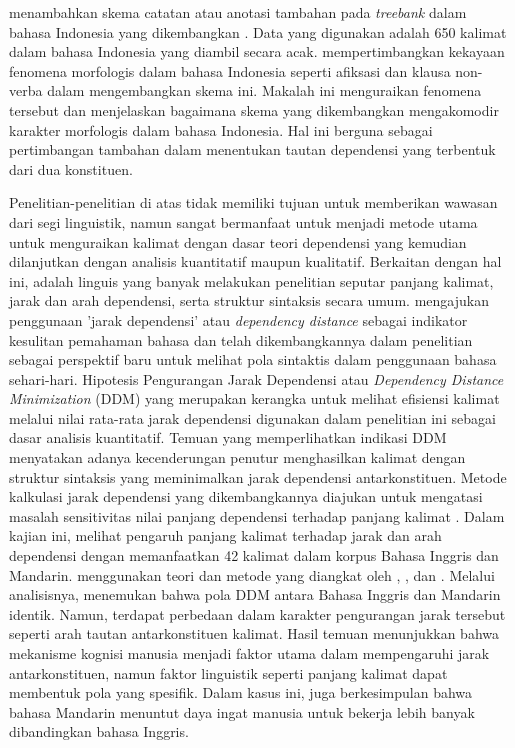 \cite{irmawati2015dependency} menambahkan skema catatan atau anotasi tambahan pada \textit{treebank} dalam bahasa Indonesia yang dikembangkan \cite{green2012indonesian}. Data yang digunakan adalah 650 kalimat dalam bahasa Indonesia yang diambil secara acak. \cite{irmawati2015dependency} mempertimbangkan kekayaan fenomena morfologis dalam bahasa Indonesia seperti afiksasi dan klausa non-verba dalam mengembangkan skema ini. Makalah ini menguraikan fenomena tersebut dan menjelaskan bagaimana skema yang dikembangkan mengakomodir karakter morfologis dalam bahasa Indonesia. Hal ini berguna sebagai pertimbangan tambahan dalam menentukan tautan dependensi yang terbentuk dari dua konstituen. 

Penelitian-penelitian di atas tidak memiliki tujuan untuk memberikan wawasan dari segi linguistik, namun sangat bermanfaat untuk menjadi metode utama untuk menguraikan kalimat dengan dasar teori dependensi yang kemudian dilanjutkan dengan analisis kuantitatif maupun kualitatif. Berkaitan dengan hal ini, \cite{liu2008dependency} adalah linguis yang banyak melakukan penelitian seputar panjang kalimat, jarak dan arah dependensi, serta struktur sintaksis secara umum. \cite{liu2008dependency} mengajukan penggunaan 'jarak dependensi' atau \textit{dependency distance} sebagai indikator kesulitan pemahaman bahasa dan telah dikembangkannya dalam penelitian \cite{liu2017dependency} sebagai perspektif baru untuk melihat pola sintaktis dalam penggunaan bahasa sehari-hari. Hipotesis Pengurangan Jarak Dependensi atau \textit{Dependency Distance Minimization} (DDM) yang merupakan kerangka untuk melihat efisiensi kalimat melalui nilai rata-rata jarak dependensi digunakan dalam penelitian ini sebagai dasar analisis kuantitatif. Temuan yang memperlihatkan indikasi DDM menyatakan adanya kecenderungan penutur menghasilkan kalimat dengan struktur sintaksis yang meminimalkan jarak dependensi antarkonstituen. Metode kalkulasi jarak dependensi yang dikembangkannya diajukan untuk mengatasi masalah sensitivitas nilai panjang dependensi terhadap panjang kalimat \citep{jiang2015effects}. Dalam kajian ini, \cite{jiang2015effects} melihat pengaruh panjang kalimat terhadap jarak dan arah dependensi dengan memanfaatkan 42 kalimat dalam korpus Bahasa Inggris dan Mandarin. \cite{jiang2015effects} menggunakan teori dan metode yang diangkat oleh \cite{tesniere1959elements}, \cite{hudson2007language}, dan \cite{nivre2006maltparser}. Melalui analisisnya,  \cite{jiang2015effects} menemukan bahwa pola DDM antara Bahasa Inggris dan Mandarin identik. Namun, terdapat perbedaan dalam karakter pengurangan jarak tersebut seperti arah tautan antarkonstituen kalimat. Hasil temuan menunjukkan bahwa mekanisme kognisi manusia menjadi faktor utama dalam mempengaruhi jarak antarkonstituen, namun faktor linguistik seperti panjang kalimat dapat membentuk pola yang spesifik. Dalam kasus ini, \cite{jiang2015effects} juga berkesimpulan bahwa bahasa Mandarin menuntut daya ingat manusia untuk bekerja lebih banyak dibandingkan bahasa Inggris. 


